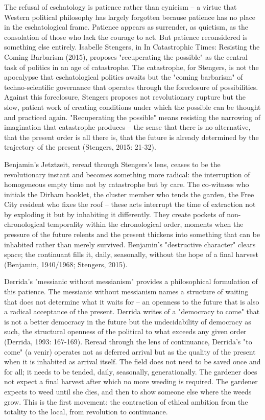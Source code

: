 The refusal of eschatology is patience rather than cynicism -- a virtue that Western political philosophy has largely forgotten because patience has no place in the eschatological frame. Patience appears as surrender, as quietism, as the consolation of those who lack the courage to act. But patience reconsidered is something else entirely. Isabelle Stengers, in In Catastrophic Times: Resisting the Coming Barbarism (2015), proposes "recuperating the possible" as the central task of politics in an age of catastrophe. The catastrophe, for Stengers, is not the apocalypse that eschatological politics awaits but the "coming barbarism" of techno-scientific governance that operates through the foreclosure of possibilities. Against this foreclosure, Stengers proposes not revolutionary rupture but the slow, patient work of creating conditions under which the possible can be thought and practiced again. "Recuperating the possible" means resisting the narrowing of imagination that catastrophe produces -- the sense that there is no alternative, that the present order is all there is, that the future is already determined by the trajectory of the present (Stengers, 2015: 21-32).

Benjamin's Jetztzeit, reread through Stengers's lens, ceases to be the revolutionary instant and becomes something more radical: the interruption of homogeneous empty time not by catastrophe but by care. The co-witness who initials the Dirham booklet, the cluster member who tends the garden, the Free City resident who fixes the roof -- these acts interrupt the time of extraction not by exploding it but by inhabiting it differently. They create pockets of non-chronological temporality within the chronological order, moments when the pressure of the future relents and the present thickens into something that can be inhabited rather than merely survived. Benjamin's "destructive character" clears space; the continuant fills it, daily, seasonally, without the hope of a final harvest (Benjamin, 1940/1968; Stengers, 2015).

Derrida's "messianic without messianism" provides a philosophical formulation of this patience. The messianic without messianism names a structure of waiting that does not determine what it waits for -- an openness to the future that is also a radical acceptance of the present. Derrida writes of a "democracy to come" that is not a better democracy in the future but the undecidability of democracy as such, the structural openness of the political to what exceeds any given order (Derrida, 1993: 167-169). Reread through the lens of continuance, Derrida's "to come" (a venir) operates not as deferred arrival but as the quality of the present when it is inhabited as arrival itself. The field does not need to be saved once and for all; it needs to be tended, daily, seasonally, generationally. The gardener does not expect a final harvest after which no more weeding is required. The gardener expects to weed until she dies, and then to show someone else where the weeds grow. This is the first movement: the contraction of ethical ambition from the totality to the local, from revolution to continuance.

